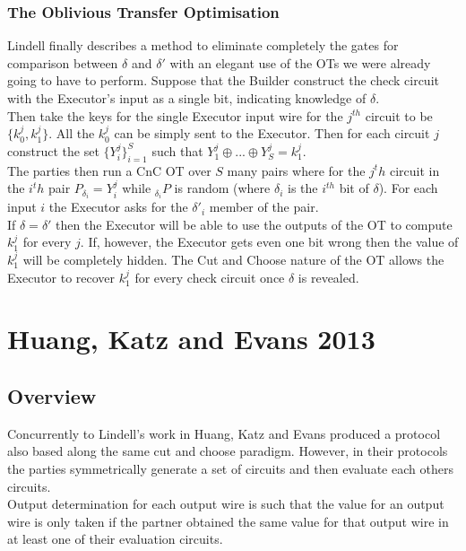\documentclass[ %
                    author={Nicholas Tutte},
                supervisor={Prof. Nigel Smart},
                    degree={MEng},
                     title={Secure Two Party Computation},
                  subtitle={A practical comparison of recent protocols},
                      type={Research - GG1K},
                      year={2015} ]{dissertation}
\begin{document}
				\subsubsection{The Oblivious Transfer Optimisation}
					Lindell finally describes a method to eliminate completely the gates for comparison between $\delta$ and $\delta'$ with an elegant use of the OTs we were already going to have to perform. Suppose that the Builder construct the check circuit with the Executor's input as a single bit, indicating knowledge of $\delta$.\\

					Then take the keys for the single Executor input wire for the $j^{th}$ circuit to be $\{k_0^j, k_1^j\}$. All the $k_0^j$ can be simply sent to the Executor. Then for each circuit $j$ construct the set $\{Y_i^j\}_{i = 1}^{S}$ such that $Y_1^j \oplus ... \oplus Y_S^j = k_1^j$.\\

					The parties then run a CnC OT over $S$ many pairs where for the $j^th$ circuit in the $i^th$ pair $P_{\delta_i} = Y_i^j$ while $_{\delta_i}P$ is random (where $\delta_i$ is the $i^{th}$ bit of $\delta$). For each input $i$ the Executor asks for the $\delta'_i$ member of the pair.\\

					If $\delta = \delta'$ then the Executor will be able to use the outputs of the OT to compute $k_1^j$ for every $j$. If, however, the Executor gets even one bit wrong then the value of $k_1^j$ will be completely hidden. The Cut and Choose nature of the OT allows the Executor to recover $k_1^j$ for every check circuit once $\delta$ is revealed.

				

		\section{Huang, Katz and Evans 2013}
			\subsection*{Overview}

				Concurrently to Lindell's work in \cite{Lindell_CnC_2013} Huang, Katz and Evans produced a protocol also based along the same cut and choose paradigm. However, in their protocols the parties symmetrically generate a set of circuits and then evaluate each others circuits.\\

				Output determination for each output wire is such that the value for an output wire is only taken if the partner obtained the same value for that output wire in at least one of their evaluation circuits.\\
\end{document}

